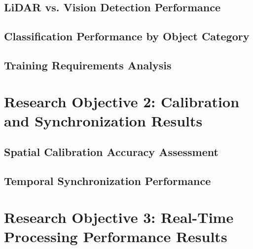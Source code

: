 \documentclass{erauthesis}
\begin{document}

\subsection{LiDAR vs. Vision Detection Performance}

\subsection{Classification Performance by Object Category}

\subsection{Training Requirements Analysis}

\section{Research Objective 2: Calibration and Synchronization Results}


\subsection{Spatial Calibration Accuracy Assessment}

\subsection{Temporal Synchronization Performance}

\section{Research Objective 3: Real-Time Processing Performance Results}
\end{document}
